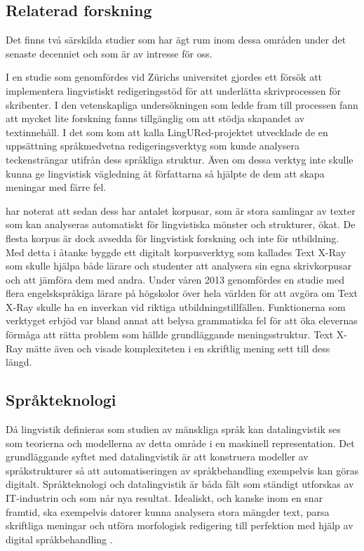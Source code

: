 \documentclass[swedish]{maucsthesis}
\begin{document}
\subsection{Relaterad forskning}\label{relateradforskning}

Det finns två särskilda studier som har ägt rum inom dessa områden under det
senaste decenniet och som är av intresse för oss.

I en studie som genomfördes vid Zürichs universitet gjordes ett försök att
implementera lingvistiskt redigeringsstöd för att underlätta skrivprocessen för
skribenter. I den vetenskapliga undersökningen som ledde fram till processen
fann \cite{Piotrowski:2009} att mycket lite forskning fanns tillgänglig om att
stödja skapandet av textinnehåll. I det som \citeauthor{Piotrowski:2009} kom att
kalla LingURed-projektet utvecklade de en uppsättning språkmedvetna
redigeringsverktyg som kunde analysera teckensträngar utifrån dess språkliga
struktur. Även om dessa verktyg inte skulle kunna ge lingvistisk vägledning åt
författarna så hjälpte de dem att skapa meningar med färre fel.

\cite{zhu:2015} har noterat att sedan dess har antalet korpusar, som är stora
samlingar av texter som kan analyseras automatiskt för lingvistiska mönster och
strukturer, ökat. De flesta korpus är dock avsedda för lingvistisk forskning och
inte för utbildning. Med detta i åtanke byggde \citeauthor{zhu:2015} ett
digitalt korpusverktyg som kallades Text X-Ray som skulle hjälpa både lärare och
studenter att analysera sin egna skrivkorpusar och att jämföra dem med andra.
Under våren 2013 genomfördes en studie med flera engelskspråkiga lärare på
högskolor över hela världen för att avgöra om Text X-Ray skulle ha en inverkan
vid riktiga utbildningstillfällen. Funktionerna som verktyget erbjöd var bland
annat att belysa grammatiska fel för att öka elevernas förmåga att rätta problem
som hällde grundläggande meningsstruktur. Text X-Ray mätte även och visade
komplexiteten i en skriftlig mening sett till dess längd.

\subsection{Språkteknologi}\label{språkteknologi}

Då lingvistik definieras som studien av mänskliga språk kan datalingvistik ses
som teorierna och modellerna av detta område i en maskinell representation. Det
grundläggande syftet med datalingvistik är att konstruera modeller av
språkstrukturer så att automatiseringen av språkbehandling exempelvis kan göras
digitalt. Språkteknologi och datalingvistik är båda fält som ständigt utforskas
av IT-industrin och som når nya resultat. Idealiskt, och kanske inom en snar
framtid, ska exempelvis datorer kunna analysera stora mängder text, parsa
skriftliga meningar och utföra morfologisk redigering till perfektion med hjälp
av digital språkbehandling \citep{nugues:2014}.
\end{document}
